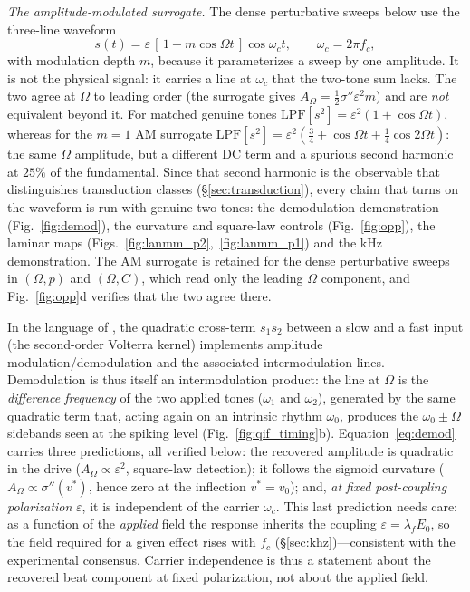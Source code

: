 \documentclass[11pt,a4paper]{article}
\newcommand{\Sig}{\sigma}
\newcommand{\half}{\tfrac{1}{2}}
\begin{document}
\emph{The amplitude-modulated surrogate.} The dense perturbative sweeps below use the
three-line waveform
\begin{equation}
s(t)=\varepsilon\,[\,1+m\cos\Omega t\,]\cos\omega_c t,\qquad \omega_c=2\pi f_c ,
\label{eq:amsur}
\end{equation}
with modulation depth $m$, because it parameterizes a sweep by one amplitude. It is not
the physical signal: it carries a line at $\omega_c$ that the two-tone sum lacks. The two
agree at $\Omega$ to leading order (the surrogate gives
$A_\Omega=\half\Sig''\varepsilon^2m$) and are \emph{not} equivalent beyond it. For matched genuine tones $\mathrm{LPF}[s^2]=\varepsilon^2(1+\cos\Omega t)$,
whereas for the $m=1$ AM surrogate
$\mathrm{LPF}[s^2]=\varepsilon^2(\tfrac34+\cos\Omega t+\tfrac14\cos2\Omega t)$: the same
$\Omega$ amplitude, but a different DC term and a spurious second harmonic at $25\%$ of
the fundamental. Since that second harmonic is the observable that
distinguishes transduction classes (\S\ref{sec:transduction}), every claim that turns on
the waveform is run with genuine two tones: the demodulation demonstration
(Fig.~\ref{fig:demod}), the curvature and square-law controls (Fig.~\ref{fig:opp}), the
laminar maps (Figs.~\ref{fig:lanmm_p2},~\ref{fig:lanmm_p1}) and the kHz demonstration.
The AM surrogate is retained for the dense perturbative sweeps in $(\Omega,p)$ and
$(\Omega,C)$, which read only the leading $\Omega$ component, and
Fig.~\ref{fig:opp}d verifies that the two agree there.

In the language of \cite{ruffini2025ham}, the quadratic cross-term $s_1 s_2$ between a
slow and a fast input (the second-order Volterra kernel) implements amplitude
modulation/demodulation and the associated intermodulation lines.
Demodulation is thus itself an intermodulation product: the line at $\Omega$ is the
\emph{difference frequency} of the two applied tones ($\omega_1$ and $\omega_2$),
generated by the same quadratic term that, acting again on an intrinsic
rhythm $\omega_0$, produces the $\omega_0\pm\Omega$ sidebands seen at the spiking level
(Fig.~\ref{fig:qif_timing}b).
Equation~\eqref{eq:demod} carries three predictions, all verified below: the
recovered amplitude is quadratic in the drive ($A_\Omega\propto\varepsilon^2$,
square-law detection); it follows the sigmoid curvature
($A_\Omega\propto\Sig''(v^*)$, hence zero at the inflection $v^*=v_0$); and, \emph{at
fixed post-coupling polarization} $\varepsilon$, it is independent of the carrier
$\omega_c$. This last prediction needs care: as a function of the \emph{applied} field the
response inherits the coupling $\varepsilon=\lambda_f E_0$, so the field required for a
given effect rises with $f_c$ (\S\ref{sec:khz})---consistent with the experimental
consensus. Carrier independence is thus a statement about the recovered beat component at fixed
polarization, not about the applied field.
\end{document}
